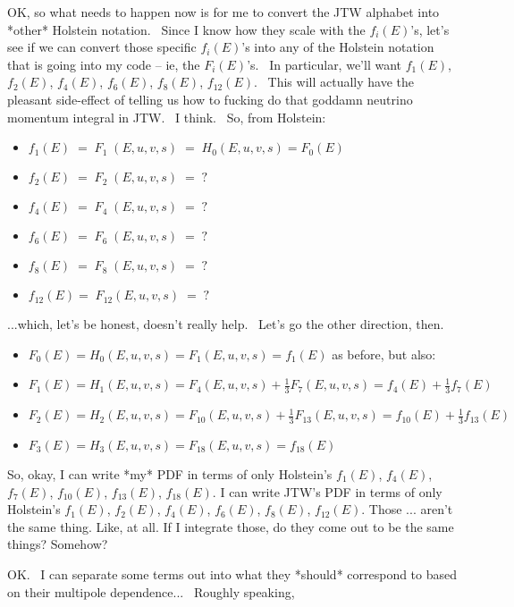 OK, so what needs to happen now is for me to convert the JTW alphabet into *other* Holstein notation.  Since I know how they scale with the $f_i(E)$'s, let's see if we can convert those specific $f_i(E)$'s into any of the Holstein notation that is going into my code -- ie, the $F_i(E)$'s.  In particular, we'll want $f_1(E)$, $f_2(E)$, $f_4(E)$, $f_6(E)$, $f_8(E)$, $f_12(E)$.  This will actually have the pleasant side-effect of telling us how to fucking do that goddamn neutrino momentum integral in JTW.  I think.  So, from Holstein:

\begin{itemize}
	\item $f_1(E) \; = \; F_1\;(E, u, v, s) \; = \; H_0(E, u, v, s) = F_0(E) $
	\item $f_2(E) \; = \; F_2\;(E, u, v, s) \; = \; ? $
	\item $f_4(E) \; = \; F_4\;(E, u, v, s) \; = \; ? $
	\item $f_6(E) \; = \; F_6\;(E, u, v, s) \; = \; ? $
	\item $f_8(E) \; = \; F_8\;(E, u, v, s) \; = \; ? $
	\item $f_{12}(E) = \; F_{12}(E, u, v, s)\; = \; ? $
\end{itemize}

...which, let's be honest, doesn't really help.  Let's go the other direction, then.

\begin{itemize}
	\item $ F_0(E) = H_0(E, u, v, s) = F_1(E, u, v, s)    = f_1(E) $    as before, but also:
	\item $ F_1(E) = H_1(E, u, v, s) = F_4(E, u, v, s) + \frac{1}{3} F_7(E, u, v, s)  = f_4(E) + \frac{1}{3} f_7(E) $
	\item $ F_2(E) = H_2(E, u, v, s) = F_{10}(E, u, v, s) + \frac{1}{3} F_{13}(E, u, v, s) = f_{10}(E) + \frac{1}{3} f_{13}(E) $ 
	\item $ F_3(E) = H_3(E, u, v, s) = F_{18}(E, u, v, s) = f_{18}(E)$ 
\end{itemize}

So, okay, I can write *my* PDF in terms of only Holstein's $ f_1(E)$,  $f_4(E)$,  $f_7(E)$,  $f_{10}(E)$,  $f_{13}(E)$,  $f_{18}(E)$.  I can write JTW's PDF in terms of only Holstein's $f_1(E)$,  $f_2(E)$,  $f_4(E)$,  $f_6(E)$,  $f_8(E)$,  $f_{12}(E)$.  Those ... aren't the same thing.  Like, at all.  If I integrate those, do they come out to be the same things?  Somehow?  

OK.  I can separate some terms out into what they *should* correspond to based on their multipole dependence...  Roughly speaking, 

